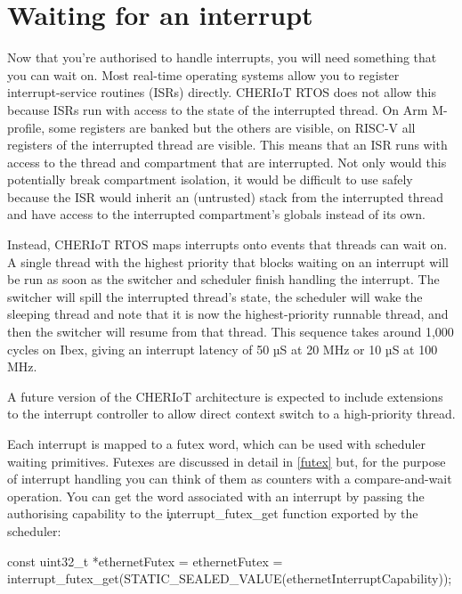 \section[label=interrupt_waiting]{Waiting for an interrupt}

Now that you're authorised to handle interrupts, you will need something that you can wait on.
Most real-time operating systems allow you to register interrupt-service routines (ISRs) directly.
CHERIoT RTOS does not allow this because ISRs run with access to the state of the interrupted thread.
On Arm M-profile, some registers are banked but the others are visible, on RISC-V all registers of the interrupted thread are visible.
This means that an ISR runs with access to the thread and compartment that are interrupted.
Not only would this potentially break compartment isolation, it would be difficult to use safely because the ISR would inherit an (untrusted) stack from the interrupted thread and have access to the interrupted compartment's globals instead of its own.

Instead, CHERIoT RTOS maps interrupts onto events that threads can wait on.
A single thread with the highest priority that blocks waiting on an interrupt will be run as soon as the switcher and scheduler finish handling the interrupt.
The switcher will spill the interrupted thread's state, the scheduler will wake the sleeping thread and note that it is now the highest-priority runnable thread, and then the switcher will resume from that thread.
This sequence takes around 1,000 cycles on Ibex, giving an interrupt latency of 50 µS at 20 MHz or 10 µS at 100 MHz.

\begin{note}
A future version of the CHERIoT architecture is expected to include extensions to the interrupt controller to allow direct context switch to a high-priority thread.
\end{note}

Each interrupt is mapped to a futex word, which can be used with scheduler waiting primitives.
Futexes are discussed in detail in \ref{futex} but, for the purpose of interrupt handling you can think of them as counters with a compare-and-wait operation.
You can get the word associated with an interrupt by passing the authorising capability to the \c{interrupt_futex_get} function exported by the scheduler:

\begin{cxxsnippet}
const uint32_t *ethernetFutex = ethernetFutex =
	interrupt_futex_get(STATIC_SEALED_VALUE(ethernetInterruptCapability));
\end{cxxsnippet}

